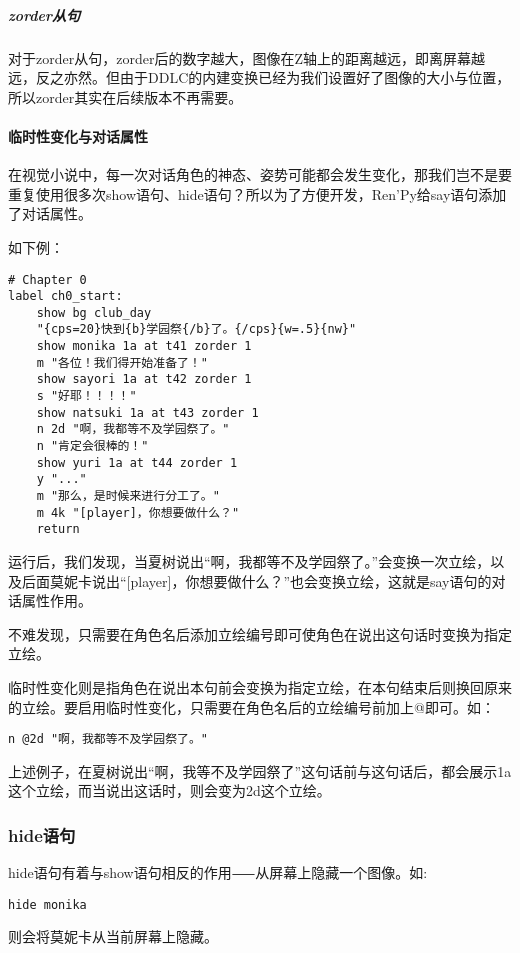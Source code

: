 \subparagraph{zorder从句}
对于zorder从句，zorder后的数字越大，图像在Z轴上的距离越远，即离屏幕越远，反之亦然。但由于DDLC的内建变换已经为我们设置好了图像的大小与位置，所以zorder其实在后续版本不再需要。

\paragraph{临时性变化与对话属性}
在视觉小说中，每一次对话角色的神态、姿势可能都会发生变化，那我们岂不是要重复使用很多次show语句、hide语句？所以为了方便开发，Ren'Py给say语句添加了对话属性。

如下例：
\begin{lstlisting}
# Chapter 0
label ch0_start:
    show bg club_day
    "{cps=20}快到{b}学园祭{/b}了。{/cps}{w=.5}{nw}"
    show monika 1a at t41 zorder 1
    m "各位！我们得开始准备了！"
    show sayori 1a at t42 zorder 1
    s "好耶！！！！"
    show natsuki 1a at t43 zorder 1
    n 2d "啊，我都等不及学园祭了。"
    n "肯定会很棒的！"
    show yuri 1a at t44 zorder 1
    y "..."
    m "那么，是时候来进行分工了。"
    m 4k "[player]，你想要做什么？"
    return
\end{lstlisting}

运行后，我们发现，当夏树说出“啊，我都等不及学园祭了。”会变换一次立绘，以及后面莫妮卡说出“[player]，你想要做什么？”也会变换立绘，这就是say语句的对话属性作用。

不难发现，只需要在角色名后添加立绘编号即可使角色在说出这句话时变换为指定立绘。

临时性变化则是指角色在说出本句前会变换为指定立绘，在本句结束后则换回原来的立绘。要启用临时性变化，只需要在角色名后的立绘编号前加上@即可。如：
\begin{lstlisting}[numbers=none]
    n @2d "啊，我都等不及学园祭了。"
\end{lstlisting}

上述例子，在夏树说出“啊，我等不及学园祭了”这句话前与这句话后，都会展示1a这个立绘，而当说出这话时，则会变为2d这个立绘。

\subsubsection{hide语句}

hide语句有着与show语句相反的作用⸺从屏幕上隐藏一个图像。如:

\begin{lstlisting}[numbers=none]
hide monika
\end{lstlisting}

则会将莫妮卡从当前屏幕上隐藏。

